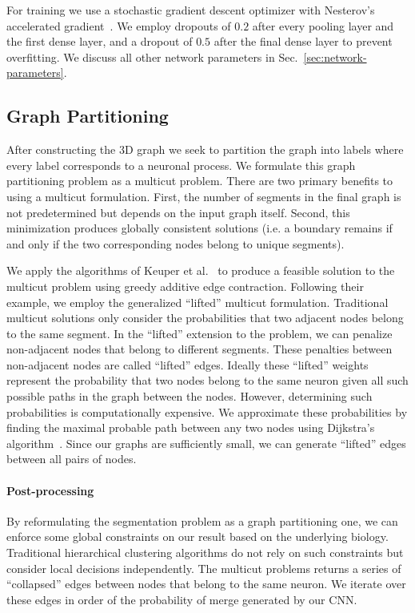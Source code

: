 For training we use a stochastic gradient descent optimizer with Nesterov's accelerated gradient~\cite{nesterov1983method}. 
We employ dropouts of $0.2$ after every pooling layer and the first dense layer, and a dropout of $0.5$ after the final dense layer to prevent overfitting. 
We discuss all other network parameters in Sec.~\ref{sec:network-parameters}.

\subsection{Graph Partitioning}
After constructing the 3D graph we seek to partition the graph into labels where every label corresponds to a neuronal process. 
We formulate this graph partitioning problem as a multicut problem.
There are two primary benefits to using a multicut formulation. 
First, the number of segments in the final graph is not predetermined but depends on the input graph itself. 
Second, this minimization produces globally consistent solutions (i.e. a boundary remains if and only if the two corresponding nodes belong to unique segments).

We apply the algorithms of Keuper et al.~\cite{keuper2015efficient} to produce a feasible solution to the multicut problem using greedy additive edge contraction.
Following their example, we employ the generalized ``lifted'' multicut formulation.
Traditional multicut solutions only consider the probabilities that two adjacent nodes belong to the same segment. 
In the ``lifted'' extension to the problem, we can penalize non-adjacent nodes that belong to different segments. 
These penalties between non-adjacent nodes are called ``lifted'' edges. 
Ideally these ``lifted'' weights represent the probability that two nodes belong to the same neuron given all such possible paths in the graph between the nodes.
However, determining such probabilities is computationally expensive.
We approximate these probabilities by finding the maximal probable path between any two nodes using Dijkstra's algorithm~\cite{keuper2015efficient}.
Since our graphs are sufficiently small, we can generate ``lifted'' edges between all pairs of nodes. 

\paragraph{Post-processing}

By reformulating the segmentation problem as a graph partitioning one, we can enforce some global constraints on our result based on the underlying biology.
Traditional hierarchical clustering algorithms do not rely on such constraints but consider local decisions independently.
The multicut problems returns a series of ``collapsed'' edges between nodes that belong to the same neuron.
We iterate over these edges in order of the probability of merge generated by our CNN. 
